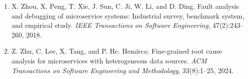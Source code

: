 \begin{enumerate}[leftmargin=2em,itemsep=2pt]
\item X. Zhou, X. Peng, T. Xie, J. Sun, C. Ji, W. Li, and D. Ding. Fault analysis and debugging of microservice systems: Industrial survey, benchmark system, and empirical study. \textit{IEEE Transactions on Software Engineering}, 47(2):243--260, 2018.

\item Z. Zhu, C. Lee, X. Tang, and P. He. Hemirca: Fine-grained root cause analysis for microservices with heterogeneous data sources. \textit{ACM Transactions on Software Engineering and Methodology}, 33(8):1--25, 2024.

\end{enumerate}
